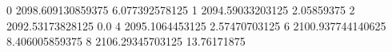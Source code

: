 0 2098.609130859375 6.077392578125
1 2094.59033203125 2.05859375
2 2092.53173828125 0.0
4 2095.1064453125 2.57470703125
6 2100.937744140625 8.406005859375
8 2106.29345703125 13.76171875
